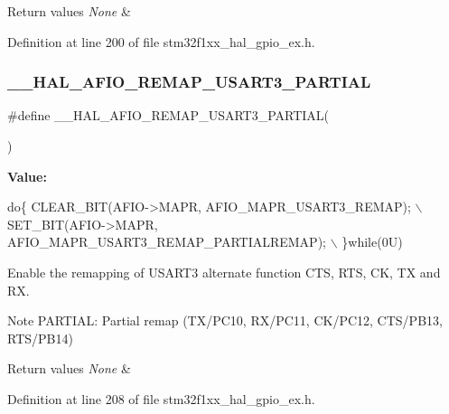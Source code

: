 \begin{DoxyRetVals}{Return values}
{\em None} & \\
\hline
\end{DoxyRetVals}


Definition at line 200 of file stm32f1xx\+\_\+hal\+\_\+gpio\+\_\+ex.\+h.

\mbox{\label{group___g_p_i_o_ex___a_f_i_o___a_f___r_e_m_a_p_p_i_n_g_ga176ae8487c80d60664759a295961de31}} 
\subsubsection{\texorpdfstring{\+\_\+\+\_\+\+H\+A\+L\+\_\+\+A\+F\+I\+O\+\_\+\+R\+E\+M\+A\+P\+\_\+\+U\+S\+A\+R\+T3\+\_\+\+P\+A\+R\+T\+I\+AL}{\_\_HAL\_AFIO\_REMAP\_USART3\_PARTIAL}}
{\footnotesize\ttfamily \#define \+\_\+\+\_\+\+H\+A\+L\+\_\+\+A\+F\+I\+O\+\_\+\+R\+E\+M\+A\+P\+\_\+\+U\+S\+A\+R\+T3\+\_\+\+P\+A\+R\+T\+I\+AL(\begin{DoxyParamCaption}{ }\end{DoxyParamCaption})}

{\bfseries Value\+:}
\begin{DoxyCode}
\textcolor{keywordflow}{do}\{ CLEAR\_BIT(AFIO->MAPR, AFIO\_MAPR\_USART3\_REMAP);            \(\backslash\)
                                              SET\_BIT(AFIO->MAPR, AFIO\_MAPR\_USART3\_REMAP\_PARTIALREMAP); \(\backslash\)
                                            \}\textcolor{keywordflow}{while}(0U)
\end{DoxyCode}


Enable the remapping of U\+S\+A\+R\+T3 alternate function C\+TS, R\+TS, CK, TX and RX. 

\begin{DoxyNote}{Note}
P\+A\+R\+T\+I\+AL\+: Partial remap (T\+X/\+P\+C10, R\+X/\+P\+C11, C\+K/\+P\+C12, C\+T\+S/\+P\+B13, R\+T\+S/\+P\+B14) 
\end{DoxyNote}

\begin{DoxyRetVals}{Return values}
{\em None} & \\
\hline
\end{DoxyRetVals}


Definition at line 208 of file stm32f1xx\+\_\+hal\+\_\+gpio\+\_\+ex.\+h.

